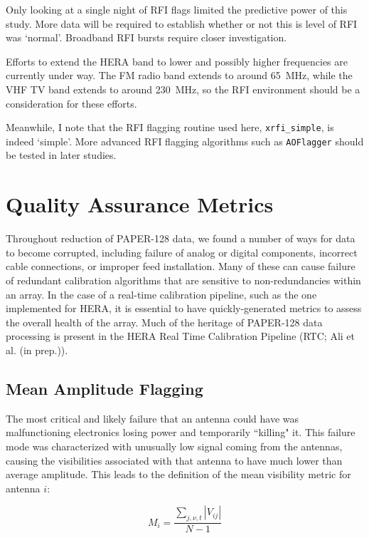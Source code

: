 Only looking at a single night of RFI flags limited the predictive power of this study. More data will be required to establish whether or not this is level of RFI was `normal'. Broadband RFI bursts require closer investigation.

Efforts to extend the HERA band to lower and possibly higher frequencies are currently under way. The FM radio band extends to around 65~MHz, while the VHF TV band extends to around 230~MHz, so the RFI environment should be a consideration for these efforts.

Meanwhile, I note that the RFI flagging routine used here, {\tt xrfi\_simple}, is indeed `simple'. More advanced RFI flagging algorithms such as {\tt AOFlagger} \citep{AOflag} should be tested in later studies.

\section{Quality Assurance Metrics}

Throughout reduction of PAPER-128 data, we found a number of ways for data to become corrupted, including failure of analog or digital components, incorrect cable connections, or improper feed installation. Many of these can cause failure of redundant calibration algorithms that are sensitive to non-redundancies within an array. In the case of a real-time calibration pipeline, such as the one implemented for HERA, it is essential to have quickly-generated metrics to assess the overall health of the array. Much of the heritage of PAPER-128 data processing is present in the HERA Real Time Calibration Pipeline (RTC; {\color{red} Ali et al. (in prep.)}).

\subsection{Mean Amplitude Flagging}
\label{subsec:meanvij}

The most critical and likely failure that an antenna could have was malfunctioning electronics losing power and temporarily ``killing" it.
This failure mode was characterized with unusually low signal coming from the antennas, causing the visibilities
associated with that antenna to have much lower than average amplitude. This
leads to the definition of the mean visibility metric for antenna ${i}$:

\begin{equation}
    M_{i} = \frac{ \sum_{j,\nu,t} {|V_{ij}|} }{N-1}
\label{eq:meanvij}
\end{equation}

